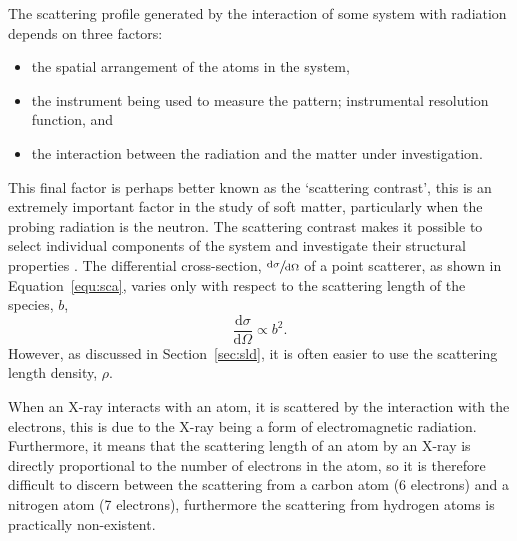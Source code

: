 The scattering profile generated by the interaction of some system with radiation depends on three factors:
%
\begin{itemize}
    \item the spatial arrangement of the atoms in the system,
    \item the instrument being used to measure the pattern; instrumental resolution function, and
    \item the interaction between the radiation and the matter under investigation.
\end{itemize}
%
This final factor is perhaps better known as the `scattering contrast', this is an extremely important factor in the study of soft matter, particularly when the probing radiation is the neutron.
The scattering contrast makes it possible to select individual components of the system and investigate their structural properties \cite{schurtenberger_contrast_2002}.
The differential cross-section, $\sfrac{\text{d}\sigma}{\text{d}\Omega}$ of a point scatterer, as shown in Equation~\ref{equ:sca}, varies only with respect to the scattering length of the species, $b$,
%
\begin{equation}
    \frac{\text{d}\sigma}{\text{d}\Omega} \propto b^2.
\end{equation}
%
However, as discussed in Section~\ref{sec:sld}, it is often easier to use the scattering length density, $\rho$.

When an X-ray interacts with an atom, it is scattered by the interaction with the electrons, this is due to the X-ray being a form of electromagnetic radiation.
Furthermore, it means that the scattering length of an atom by an X-ray is directly proportional to the number of electrons in the atom, so it is therefore difficult to discern between the scattering from a carbon atom (6 electrons) and a nitrogen atom (7 electrons), furthermore the scattering from hydrogen atoms is practically non-existent.

